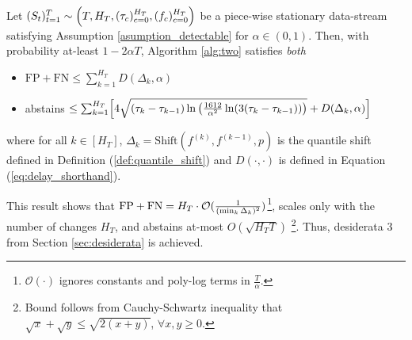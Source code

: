\begin{theorem}
Let $(S_t)_{t = 1}^T \sim \Bigl(T,H_T, (\tau_c)_{c=0}^{H_T}, (f_c)_{c=0}^{H_T}\Bigr)$ be  a piece-wise stationary data-stream satisfying Assumption \ref{asumption_detectable} for $\alpha \in (0,1)$. Then, with probability at-least $1-2\alpha T$,  Algorithm \ref{alg:two} satisfies {\em both} 
\begin{itemize}
    \item   $\text{FP} + \text{FN}  \leq \sum_{k=1}^{H_T}D(\Delta_{k},\alpha)$ %
    \item abstains $\leq
     \sum_{k=1}^{H_T} \Bigl[ 4 \sqrt{(\tau_k-\tau_{k-1}) \ln \left( \frac{1612}{\alpha^2} \ln(3(\tau_k-\tau_{k-1})) \right)} + D(\Delta_{k},\alpha) \Bigr]$
\end{itemize}
where for all $k \in [H_T]$, $\Delta_{k} = \text{Shift} (f^{(k)},f^{(k-1)},p)$  is the quantile shift defined in Definition (\ref{def:quantile_shift}) and $D(\cdot,\cdot)$ is defined in Equation (\ref{eq:delay_shorthand}).
\label{thm:online_shift}
\end{theorem}



\begin{remark}
    This result shows that $\text{FP}+\text{FN} =  H_T \cdot {{\mathcal{O}}}(\frac{1}{(\min_k\Delta_{k})^2}) $\footnote{$\mathcal{O}(\cdot)$ ignores constants and poly-log terms in $\frac{T}{\alpha}$.},  scales only with the number of changes $H_T$, and  abstains at-most $O(\sqrt{H_TT})$ \footnote{Bound follows from Cauchy-Schwartz inequality that $\sqrt{x} + \sqrt{y} \leq \sqrt{2(x+y)}$, $\forall x,y \geq 0$.}. Thus, desiderata $3$ from Section \ref{sec:desiderata} is achieved.  %
\end{remark}

